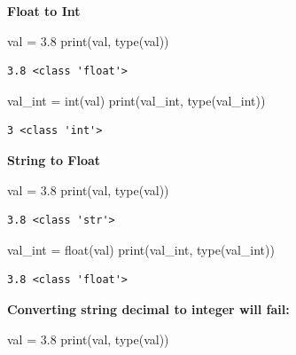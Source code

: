 \documentclass[
  letterpaper,
  DIV=11,
  numbers=noendperiod]{scrreprt}
\newenvironment{Shaded}{\begin{snugshade}}{\end{snugshade}}
\newcommand{\BuiltInTok}[1]{\textcolor[rgb]{0.00,0.23,0.31}{#1}}
\newcommand{\FloatTok}[1]{\textcolor[rgb]{0.68,0.00,0.00}{#1}}
\newcommand{\NormalTok}[1]{\textcolor[rgb]{0.00,0.23,0.31}{#1}}
\newcommand{\OperatorTok}[1]{\textcolor[rgb]{0.37,0.37,0.37}{#1}}
\newcommand{\StringTok}[1]{\textcolor[rgb]{0.13,0.47,0.30}{#1}}
\begin{document}
\textbf{Float to Int}

\begin{Shaded}
\begin{Highlighting}[]
\NormalTok{val }\OperatorTok{=} \FloatTok{3.8}
\BuiltInTok{print}\NormalTok{(val, }\BuiltInTok{type}\NormalTok{(val))}
\end{Highlighting}
\end{Shaded}

\begin{verbatim}
3.8 <class 'float'>
\end{verbatim}

\begin{Shaded}
\begin{Highlighting}[]
\NormalTok{val\_int }\OperatorTok{=} \BuiltInTok{int}\NormalTok{(val)}
\BuiltInTok{print}\NormalTok{(val\_int, }\BuiltInTok{type}\NormalTok{(val\_int))}
\end{Highlighting}
\end{Shaded}

\begin{verbatim}
3 <class 'int'>
\end{verbatim}

\textbf{String to Float}

\begin{Shaded}
\begin{Highlighting}[]
\NormalTok{val }\OperatorTok{=} \StringTok{\textquotesingle{}3.8\textquotesingle{}}
\BuiltInTok{print}\NormalTok{(val, }\BuiltInTok{type}\NormalTok{(val))}
\end{Highlighting}
\end{Shaded}

\begin{verbatim}
3.8 <class 'str'>
\end{verbatim}

\begin{Shaded}
\begin{Highlighting}[]
\NormalTok{val\_int }\OperatorTok{=} \BuiltInTok{float}\NormalTok{(val)}
\BuiltInTok{print}\NormalTok{(val\_int, }\BuiltInTok{type}\NormalTok{(val\_int))}
\end{Highlighting}
\end{Shaded}

\begin{verbatim}
3.8 <class 'float'>
\end{verbatim}

\textbf{Converting string decimal to integer will fail:}

\begin{Shaded}
\begin{Highlighting}[]
\NormalTok{val }\OperatorTok{=} \StringTok{\textquotesingle{}3.8\textquotesingle{}}
\BuiltInTok{print}\NormalTok{(val, }\BuiltInTok{type}\NormalTok{(val))}
\end{Highlighting}
\end{Shaded}
\end{document}
